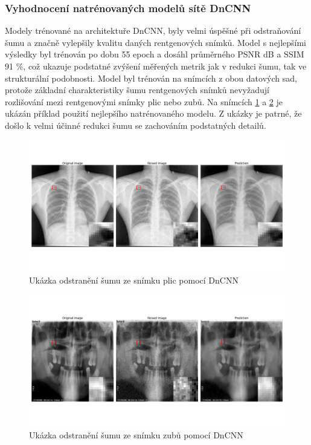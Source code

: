 \documentclass[male,czech,api_ing]{thesis}
\begin{document}
\subsubsection{Vyhodnocení natrénovaných modelů sítě DnCNN}
Modely trénované na architektuře DnCNN, byly velmi úspěšné při odstraňování šumu a značně vylepšily kvalitu daných rentgenových snímků. Model s nejlepšími výsledky byl trénován po dobu 55 epoch a dosáhl průměrného PSNR  dB a SSIM 91 \%, což ukazuje podstatné zvýšení měřených metrik jak v redukci šumu, tak ve strukturální podobnosti. Model byl trénován na snímcích z obou datových sad, protože základní charakteristiky šumu rentgenových snímků nevyžadují rozlišování mezi rentgenovými snímky plic nebo zubů. Na snímcích \ref{fig:DnCNN_lungs} a \ref{fig:DnCNN_teeth} je ukázán příklad použití nejlepšího natrénovaného modelu. Z ukázky je patrné, že došlo k velmi účinné redukci šumu se zachováním podstatných detailů.

\begin{figure}[h]
    \centering
    \includegraphics[width=\linewidth]{Prilohy/Obrazky/DnCNN_lungs.png}
    \caption{Ukázka odstranění šumu ze snímku plic pomocí DnCNN}
    \label{fig:DnCNN_lungs}
\end{figure}

\begin{figure}[h]
    \centering
    \includegraphics[width=\linewidth]{Prilohy/Obrazky/DnCNN_teeth.png}
    \caption{Ukázka odstranění šumu ze snímku zubů pomocí DnCNN}
    \label{fig:DnCNN_teeth}
\end{figure}
\end{document}
